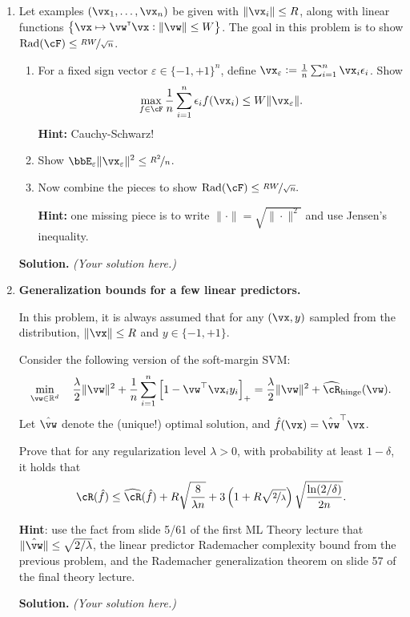 \documentclass{article}
\def\veps{\varepsilon}
\def\Rad{\textup{Rad}}
\def\hcR{\widehat{\cR}}
\def\eps{\epsilon}
\newcommand\T{{\scriptscriptstyle\mathsf{T}}}
\theoremstyle{definition}
\theoremstyle{remark}
\newenvironment{Q}
{%
\clearpage
\item
}
{%
\phantom{s}
\bigskip
\textbf{Solution.}
\emph{(Your solution here.)}
}
\begin{document}
\begin{enumerate}
\begin{Q}
    Let examples $(\vx_1,\ldots,\vx_n)$ be given with $\|\vx_i\| \leq R$,
    along with linear functions $\cbr{ \vx \mapsto \vw^\T\vx : \|\vw\|\leq W }$.
    The goal in this problem is to show $\Rad(\cF) \leq \nicefrac{RW}{\sqrt{n}}$.

    \begin{enumerate}
      \item
        For a fixed sign vector $\veps \in \{-1,+1\}^n$, define $\vx_{\veps} := \frac 1 n \sum_{i=1}^n
        \vx_i \eps_i$.
        Show
        \[
          \max_{f\in\cF} \frac 1 n \sum_{i=1}^n \eps_i f(\vx_i) \leq W \|\vx_{\veps}\|.
        \]
        \textbf{Hint:} Cauchy-Schwarz!

      \item
        Show $\displaystyle \bbE_{\veps} \|\vx_{\veps}\|^2 \leq \nicefrac {R^2} n$.

      \item
        Now combine the pieces to show
        $\displaystyle
          \Rad(\cF) \leq \nicefrac {RW}{\sqrt{n}}.
        $

        \textbf{Hint:} one missing piece is to write $\|\cdot\| = \sqrt{\|\cdot\|^2}$ and
        use Jensen's inequality.
    \end{enumerate}
\end{Q}


\begin{Q}
    \textbf{Generalization bounds for a few linear predictors.}

    In this problem, it is always assumed that for any $(\vx,y)$ sampled from the distribution,
    $\|\vx\|\le R$ and $y\in\{-1,+1\}$.

    Consider the following version of the soft-margin SVM:
    \begin{align*}
        \min_{\vw\in \mathbb{R}^d}\quad\frac{\lambda}{2}\|\vw\|^2+\frac{1}{n}\sum_{i=1}^{n}\sbr{1-\vw^{\top}\vx_iy_i}_+=\frac{\lambda}{2}\|\vw\|^2+\hcR_{\mathrm{hinge}}(\vw).
    \end{align*}
    Let $\hat{\vw}$ denote the (unique!) optimal solution, and $\hat{f}(\vx)=\hat{\vw}^{\top}\vx$.

        Prove that for any regularization level $\lambda>0$,
        with probability at least $1-\delta$,
        it holds that
        \[
          \cR(\hat f) \leq \hcR(\hat f) +  R\sqrt{\frac 8 {\lambda n}}
          + 3 \del{ 1 + R\sqrt{\nicefrac 2 \lambda} } \sqrt{\frac{\ln(2/\delta)}{2n}}.
        \]

        \textbf{Hint}: use the fact from slide 5/61 of the first ML Theory lecture
        that $\|\hat{\vw}\|\leq \sqrt{2/\lambda}$,
          the linear predictor Rademacher complexity bound from the previous problem,
          and the Rademacher generalization theorem on slide 57 of the final theory lecture.
          
\end{Q}

\end{enumerate}

% 
% 
\end{document}
